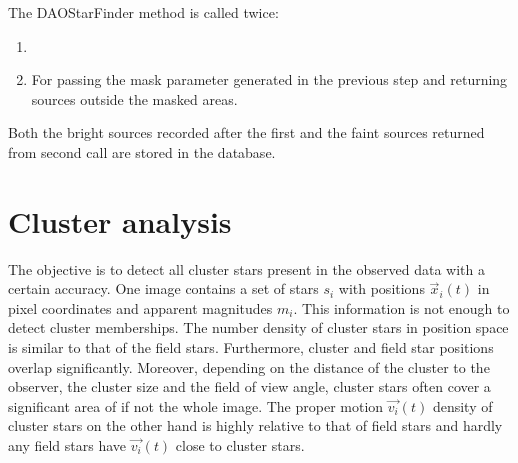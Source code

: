 \documentclass[letterpaper,10pt,english]{sphinxmanual}
\begin{document}
\sphinxAtStartPar
The DAOStarFinder method is called twice:
\begin{enumerate}
%
\item {} 

\item {} 
\sphinxAtStartPar
For passing the mask parameter generated in the previous step and returning sources outside the masked areas.

\end{enumerate}

\sphinxAtStartPar
Both the bright sources recorded after the first and the faint sources returned from second call are stored in the database.


\chapter{Cluster analysis}
\label{\detokenize{NBodySimulation/Clustering:cluster-analysis}}\label{\detokenize{NBodySimulation/Clustering::doc}}
\sphinxAtStartPar
The objective is to detect all cluster stars present in the observed data with a certain accuracy.
One image contains a set of stars \(s_{i}\) with positions \(\vec{x}_{i}\left ( t \right )\) in pixel coordinates and apparent magnitudes \(m_{i}\).
This information is not enough to detect cluster memberships. The number density of cluster stars in position space is similar to that of the field stars.
Furthermore, cluster and field star positions overlap significantly.
Moreover, depending on the distance of the cluster to the observer, the cluster size and the field of view angle, cluster stars often cover a significant area of if not the whole image.
The proper motion \(\vec{v_{i}}(t)\) density of cluster stars on the other hand is highly relative to that of field stars and hardly any field stars have \(\vec{v_{i}}(t)\) close to cluster stars.
\end{document}
